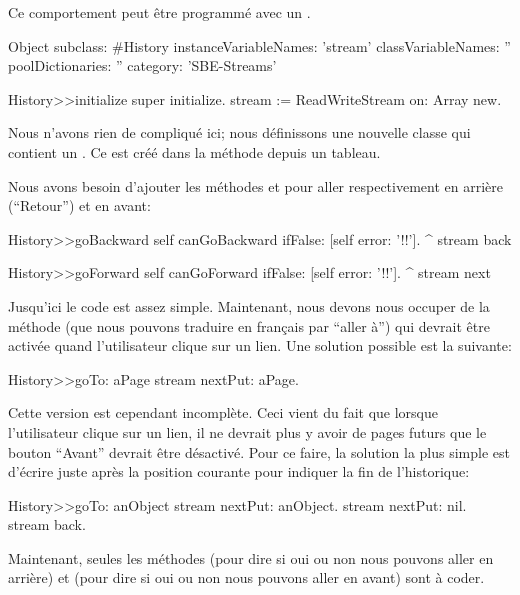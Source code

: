 \documentclass[a4paper,10pt,twoside]{book}
\begin{document}
Ce comportement peut \^etre programm\'e avec un .

\begin{code}{}
Object subclass: #History
  instanceVariableNames: 'stream'
  classVariableNames: ''
  poolDictionaries: ''
  category: 'SBE-Streams'

History>>initialize
    super initialize.
    stream := ReadWriteStream on: Array new.
\end{code}

Nous n'avons rien de compliqu\'e ici; nous d\'efinissons une nouvelle classe
qui contient un \stream. Ce \stream est cr\'eé dans la m\'ethode  
depuis un tableau.

Nous avons besoin d'ajouter les m\'ethodes  et  pour aller respectivement en arri\`ere (``Retour'') et en avant:

\begin{code}{}
History>>goBackward
  self canGoBackward ifFalse: [self error: '!!'].
  ^ stream back

History>>goForward
  self canGoForward ifFalse: [self error: '!!'].
  ^ stream next
\end{code}

Jusqu'ici le code est assez simple. Maintenant, nous devons nous occuper
de la m\'ethode  (que nous pouvons traduire en fran\c{c}ais par ``aller \`a'') qui devrait \^etre activ\'ee quand l'utilisateur
clique sur un lien. Une solution possible est la suivante:

\begin{code}{}
History>>goTo: aPage
    stream nextPut: aPage.
\end{code}

Cette version est cependant incompl\`ete. Ceci vient du fait que lorsque l'utilisateur clique sur un lien, il ne devrait plus y avoir de pages futurs \ie
que le bouton ``Avant'' devrait \^etre d\'esactiv\'e.
Pour ce faire, la solution la plus simple est d'\'ecrire 
juste apr\`es la position courante pour indiquer la fin de l'historique:

\begin{code}{}
History>>goTo: anObject
  stream nextPut: anObject.
  stream nextPut: nil.
  stream back.
\end{code}

Maintenant, seules les m\'ethodes  (pour dire si oui ou non nous pouvons aller en arri\`ere) et  (pour dire si oui ou non nous pouvons aller en avant) sont \`a coder.
\end{document}
